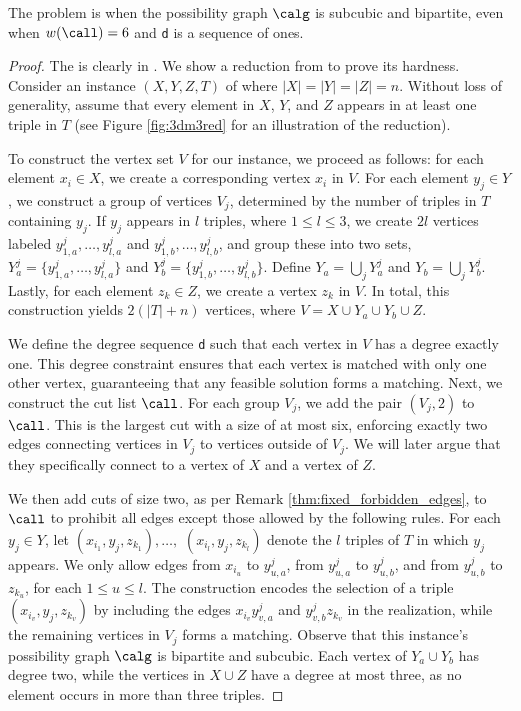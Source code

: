 \begin{theorem}
    The \GRC{} problem is \classNPC{} when the possibility graph $\calg$ is subcubic and bipartite, even when $w(\call) = 6$ and \texttt{d} is a sequence of ones.
\end{theorem}
\begin{proof}
The \GRC{} is clearly in \classNP{}. We show a reduction from \TDMT{} to prove its hardness.
%
Consider an instance $(X, Y, Z, T)$ of \TDMT{} where $|X| = |Y| = |Z| = n$. Without loss of generality, assume that every element in $X$, $Y$, and $Z$ appears in at least one triple in $T$ (see Figure \ref{fig:3dm3red} for an illustration of the reduction).

To construct the vertex set $V$ for our \GRC{} instance, we proceed as follows: for each element $x_i \in X$, we create a corresponding vertex $x_i$ in $V$.
For each element $y_j \in Y$, we construct a group of vertices $V_j$, determined by the number of triples in $T$ containing $y_j$. If $y_j$ appears in $l$ triples, where $1 \leq l \leq 3$, we create $2l$ vertices labeled $y^j_{1,a}, \ldots, y^j_{l,a}$ and $y^j_{1,b}, \ldots, y^j_{l,b}$, and group these into two sets, $Y^j_a = \{y^j_{1,a}, \ldots, y^j_{l,a}\}$ and $Y^j_b = \{y^j_{1,b}, \ldots, y^j_{l,b}\}$. Define $Y_a = \bigcup_j Y^j_a$ and $Y_b = \bigcup_j Y^j_b$.
Lastly, for each element $z_k \in Z$, we create a vertex $z_k$ in $V$. In total, this construction yields $2(|T| + n)$ vertices, where $V = X \cup Y_a \cup Y_b \cup Z$.

We define the degree sequence \texttt{d} such that each vertex in $V$ has a degree exactly one. This degree constraint ensures that each vertex is matched with only one other vertex, guaranteeing that any feasible solution forms a matching.
%
Next, we construct the cut list $\call$. For each group $V_j$, we add the pair $(V_j, 2)$ to $\call$. This is the largest cut with a size of at most six, enforcing exactly two edges connecting vertices in $V_j$ to vertices outside of $V_j$. We will later argue that they specifically connect to a vertex of $X$ and a vertex of $Z$.

We then add cuts of size two, as per Remark \ref{thm:fixed_forbidden_edges}, to $\call$ to prohibit all edges except those allowed by the following rules. For each $y_j \in Y$, let $(x_{i_1}, y_j, z_{k_1}), \ldots,$ $(x_{i_l}, y_j, z_{k_l})$ denote the $l$ triples of $T$ in which $y_j$ appears. We only allow edges from $x_{i_u}$ to $y^j_{u,a}$, from $y^j_{u,a}$ to $y^j_{u,b}$, and from $y^j_{u,b}$ to $z_{k_u}$, for each $1 \leq u \leq l$.
%
The construction encodes the selection of a triple $(x_{i_v}, y_j, z_{k_v})$ by including the edges $x_{i_v} y^j_{v,a}$ and $y^j_{v,b} z_{k_v}$ in the realization, while the remaining vertices in $V_j$ forms a matching.
%
Observe that this instance's possibility graph $\calg$ is bipartite and subcubic. Each vertex of $Y_a\cup Y_b$ has degree two, while the vertices in $X \cup Z$ have a degree at most three, as no element occurs in more than three triples.


\end{proof}
